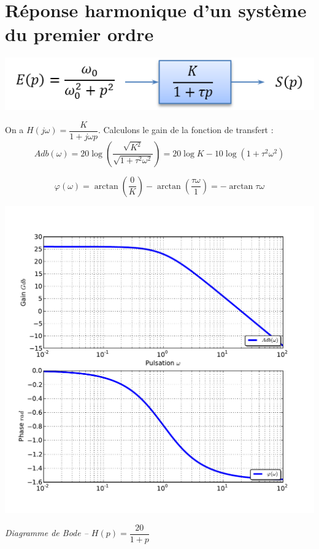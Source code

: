 \documentclass[10pt,oneside]{article}
\begin{document}
\section{Réponse harmonique d'un système du premier ordre}

\begin{minipage}[c]{.48\linewidth}
\begin{center}
\includegraphics[width=.9\textwidth]{png/ordre1_bloc}
\end{center}

On a $H(j\omega)=\dfrac{K}{1+j\omega p}$. Calculons le gain de la fonction de transfert :
$$
Adb(\omega) 
= 20\log \left(\dfrac{ \sqrt{ K^2} }{\sqrt{1+\tau^2\omega^2}}\right)
= 20\log K - 10 \log \left( 1+\tau^2\omega^2\right)
$$

$$
\varphi(\omega) 
= \arctan\left( \dfrac{0}{K}\right)-\arctan\left( \dfrac{\tau\omega}{1}\right)
= -\arctan\tau\omega
$$
\end{minipage}\hfill
\begin{minipage}[c]{.48\linewidth}
\begin{center}
\includegraphics[width=.9\textwidth]{png/ordre1_bode}

\textit{Diagramme de Bode -- $H(p)=\dfrac{20}{1+p}$}
\end{center}
\end{minipage}
\end{document}
